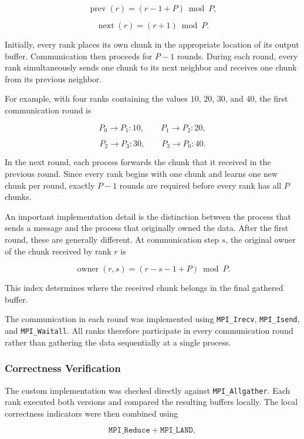 $$
\operatorname{prev}(r)=(r-1+P)\bmod P,
$$

$$
\operatorname{next}(r)=(r+1)\bmod P.
$$

Initially, every rank places its own chunk in the appropriate location
of its output buffer. Communication then proceeds for $P-1$ rounds.
During each round, every rank simultaneously sends one chunk to its
next neighbor and receives one chunk from its previous neighbor.

For example, with four ranks containing the values $10$, $20$, $30$,
and $40$, the first communication round is

$$
P_0 \rightarrow P_1:10,
\qquad
P_1 \rightarrow P_2:20,
$$

$$
P_2 \rightarrow P_3:30,
\qquad
P_3 \rightarrow P_0:40.
$$

In the next round, each process forwards the chunk that it received in
the previous round. Since every rank begins with one chunk and learns
one new chunk per round, exactly $P-1$ rounds are required before every
rank has all $P$ chunks.

An important implementation detail is the distinction between the
process that sends a message and the process that originally owned the
data. After the first round, these are generally different. At
communication step $s$, the original owner of the chunk received by
rank $r$ is

$$
\operatorname{owner}(r,s)
=
(r-s-1+P)\bmod P.
$$

This index determines where the received chunk belongs in the final
gathered buffer.

The communication in each round was implemented using
\texttt{MPI\_Irecv}, \texttt{MPI\_Isend}, and
\texttt{MPI\_Waitall}. All ranks therefore participate in every
communication round rather than gathering the data sequentially at a
single process.

\subsubsection{Correctness Verification}

The custom implementation was checked directly against
\texttt{MPI\_Allgather}. Each rank executed both versions and compared
the resulting buffers locally. The local correctness indicators were
then combined using

$$
\texttt{MPI\_Reduce}
+
\texttt{MPI\_LAND},
$$

